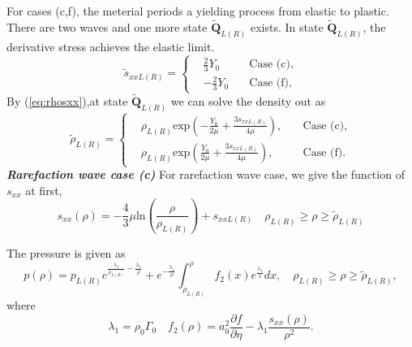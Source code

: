 \documentclass[review]{elsarticle}
\begin{document}
For cases (c,f), the meterial periods a yielding process from elastic to plastic. There are two waves and  one more state $\tilde{\mathbf{Q}}_{L(R)}$ exists. In state $\tilde{\mathbf{Q}}_{L(R)}$, the derivative stress achieves the elastic limit. 
\begin{equation}
 \tilde{s}_{xxL(R)} = \left\{ \begin{aligned}
	 &\frac{2}{3}Y_0 \quad  &\text{Case (c)},\\
	 &-\frac{2}{3}Y_0 \quad &\text{Case (f)},
	\end{aligned}
  \right.
\end{equation}
By (\ref{eq:rhosxx}),at state $\tilde{\mathbf{Q}}_{L(R)}$ we can solve the density out as 
\begin{equation}
  \tilde{\rho}_{L(R)}= \left\{ \begin{aligned}
	  & \rho_{L(R)} \text{exp}\left(-\frac{Y_0}{2\mu}+\frac{3 s_{xxL(R)}}{4\mu}\right), \quad  & \text{Case (c)}, \\ 
	  & \rho_{L(R)} \text{exp}\left(\frac{Y_0}{2\mu}+\frac{3 s_{xxL(R)}}{4\mu}\right), \quad  & \text{Case (f)}. 
	\end{aligned}
  \right.
	\end{equation}
	\emph{\textbf{Rarefaction wave case (c)}}
For rarefaction wave case,
we give the function of $s_{xx}$ at first,
\begin{equation}
  s_{xx}(\rho) =
	 -\frac{4}{3}\mu\text{ln}\left(\frac{\rho}{\rho_{L(R)}}\right)+s_{xxL(R)} \quad  \rho_{L(R)} \ge \rho \ge \tilde{\rho}_{L(R)}
  \end{equation}

The pressure is given as 
\begin{equation}
  p(\rho)=
	  p_{L(R)}e^{\frac{\lambda_1}{\rho_{L(R)}}-\frac{\lambda_1}{\rho}} +e^{-\frac{\lambda_1}{\rho}}\int_{\rho_{L(R)}}^{\rho} f_2(x) e^{\frac{\lambda_1}{x}}dx,\quad  \rho_{L(R)}\ge \rho \ge \tilde{\rho}_{L(R)},
\end{equation}
where 
\begin{equation}
  \lambda_1 = \rho_0 \Gamma_0 \quad f_2(\rho) = a_0^2\frac{\partial f}{\partial \eta}- \lambda_1\frac{s_{xx}(\rho)}{\rho^2}.
\end{equation}
\end{document}
